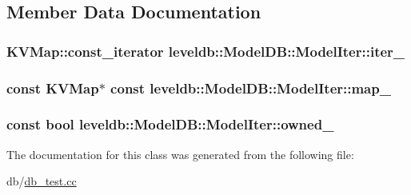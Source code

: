 \subsection{Member Data Documentation}
\hypertarget{classleveldb_1_1_model_d_b_1_1_model_iter_a8eef8d86a26c6b3c85a9498eb42e1075}{
\subsubsection[{iter\-\_\-}]{\setlength{\rightskip}{0pt plus 5cm}K\-V\-Map\-::const\-\_\-iterator leveldb\-::\-Model\-D\-B\-::\-Model\-Iter\-::iter\-\_\-\hspace{0.3cm}{\ttfamily [private]}}}\label{classleveldb_1_1_model_d_b_1_1_model_iter_a8eef8d86a26c6b3c85a9498eb42e1075}
\hypertarget{classleveldb_1_1_model_d_b_1_1_model_iter_aa50a4687f4db3ec38d01b7901c4e7fa0}{
\subsubsection[{map\-\_\-}]{\setlength{\rightskip}{0pt plus 5cm}const {\bf K\-V\-Map}$\ast$ const leveldb\-::\-Model\-D\-B\-::\-Model\-Iter\-::map\-\_\-\hspace{0.3cm}{\ttfamily [private]}}}\label{classleveldb_1_1_model_d_b_1_1_model_iter_aa50a4687f4db3ec38d01b7901c4e7fa0}
\hypertarget{classleveldb_1_1_model_d_b_1_1_model_iter_af5a4dd226cf3421411b622f9a9709c61}{
\subsubsection[{owned\-\_\-}]{\setlength{\rightskip}{0pt plus 5cm}const bool leveldb\-::\-Model\-D\-B\-::\-Model\-Iter\-::owned\-\_\-\hspace{0.3cm}{\ttfamily [private]}}}\label{classleveldb_1_1_model_d_b_1_1_model_iter_af5a4dd226cf3421411b622f9a9709c61}


The documentation for this class was generated from the following file\-:\begin{DoxyCompactItemize}
\item 
db/\hyperlink{db__test_8cc}{db\-\_\-test.\-cc}\end{DoxyCompactItemize}
